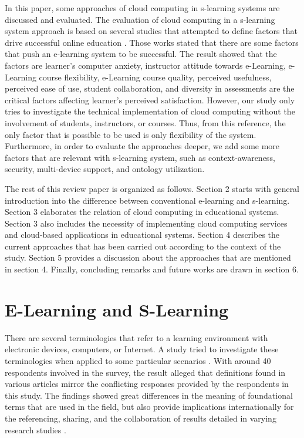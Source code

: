 \documentclass[journal]{vgtc}
\begin{document}
In this paper, some approaches of cloud computing in s-learning systems are discussed and evaluated. The evaluation of cloud computing in a s-learning system approach is based on several studies that attempted to define factors that drive successful online education \cite{Sun2008,Fetaji2007,Laily2013}. Those works stated that there are some factors that push an e-learning system to be successful. The result showed that the factors are learner's computer anxiety, instructor attitude towards e-Learning, e-Learning course flexibility, e-Learning course quality, perceived usefulness, perceived ease of use, student collaboration, and diversity in assessments are the critical factors affecting learner's perceived satisfaction. However, our study only tries to investigate the technical implementation of cloud computing without the involvement of students, instructors, or courses. Thus, from this reference, the only factor that is possible to be used is only flexibility of the system. Furthermore, in order to evaluate the approaches deeper, we add some more factors that are relevant with s-learning system, such as context-awareness, security, multi-device support, and ontology utilization.

The rest of this review paper is organized as follows. Section 2 starts with general introduction into the difference between conventional e-learning and s-learning. Section 3 elaborates the relation of cloud computing in educational systems. Section 3 also includes the necessity of implementing cloud computing services and cloud-based applications in educational systems. Section 4 describes the current approaches that has been carried out according to the context of the study. Section 5 provides a discussion about the approaches that are mentioned in section 4. Finally, concluding remarks and future works are drawn in section 6.

\section{E-Learning and S-Learning}
There are several terminologies that refer to a learning environment with electronic devices, computers, or Internet. A study tried to investigate these terminologies when applied to some particular scenarios \cite{Moore2011}. With around 40 respondents involved in the survey, the result alleged that definitions found in various articles mirror the conflicting responses provided by the respondents in this study. The findings showed great differences in the meaning of foundational terms that are used in the field, but also provide implications internationally for the referencing, sharing, and the collaboration of results detailed in varying research studies \cite{Moore2011}.
\end{document}
